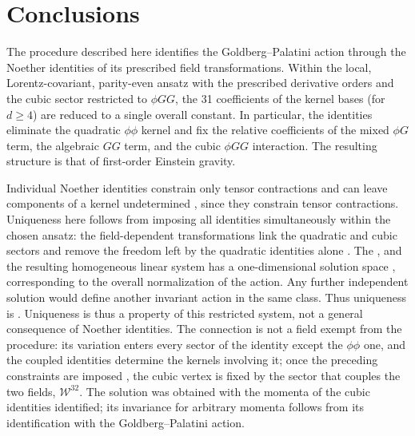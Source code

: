 \documentclass[prd,aps,preprint,superscriptaddress,nofootinbib,amsmath,amssymb,eqsecnum]{revtex4-2}
\newcommand{\W}{\mathcal{W}}
\providecommand{\DIFaddtex}[1]{{\protect\color{blue} \sf #1}} %
\providecommand{\DIFdeltex}[1]{{\protect\color{red} \scriptsize #1}} %
\providecommand{\DIFaddbegin}{} %
\providecommand{\DIFaddend}{} %
\providecommand{\DIFdelbegin}{} %
\providecommand{\DIFdelend}{} %
\providecommand{\DIFadd}[1]{\texorpdfstring{\DIFaddtex{#1}}{#1}} %
\providecommand{\DIFdel}[1]{\texorpdfstring{\DIFdeltex{#1}}{}} %
\begin{document}
\section{Conclusions}
\label{sec:conclusions}

The procedure described here identifies the Goldberg--Palatini action through the
Noether identities of its prescribed field transformations. Within the local,
Lorentz-covariant, parity-even ansatz with the prescribed derivative orders and the cubic
sector restricted to $\phi GG$, the 31 coefficients of the kernel bases (for $d\geq4$) are
reduced to a single overall constant.
In particular, the identities eliminate the quadratic $\phi\phi$ kernel and fix the relative
coefficients of the mixed $\phi G$ term, the algebraic $GG$ term, and the cubic $\phi GG$
interaction. The resulting structure is that of first-order Einstein gravity.

Individual Noether identities \DIFaddbegin \DIFadd{constrain only tensor contractions and }\DIFaddend can leave components of
a kernel undetermined\DIFdelbegin \DIFdel{, since they
constrain tensor contractions}\DIFdelend . Uniqueness here follows from imposing all identities simultaneously\DIFdelbegin \DIFdel{within the chosen ansatz}\DIFdelend :
the field-dependent transformations link the quadratic and cubic sectors and remove the
freedom left by the quadratic identities alone\DIFdelbegin \DIFdel{.
The }\DIFdelend \DIFaddbegin \DIFadd{, and the }\DIFaddend resulting homogeneous linear system
has a one-dimensional solution space\DIFdelbegin \DIFdel{, corresponding
to the overall normalization of the action. Any further independent solution would define
another invariant action in the same class. Thus uniqueness is }\DIFdelend \DIFaddbegin \DIFadd{. Uniqueness is thus }\DIFaddend a property of this restricted
system, not a general consequence of Noether identities. The connection is not a field
exempt from the procedure: its variation enters every sector of the identity except the
$\phi\phi$ one, and \DIFdelbegin \DIFdel{the coupled identities determine the kernels involving it; }\DIFdelend once the preceding constraints are imposed \DIFdelbegin \DIFdel{, }\DIFdelend the cubic vertex is fixed by
the sector that couples the two fields, $\W^{32}$.
\DIFdelbegin \DIFdel{The solution was obtained with the momenta of the cubic identities identified; its invariance for arbitrary momenta follows
from its identification with the Goldberg--Palatini action.
}\DIFdelend 
\end{document}
